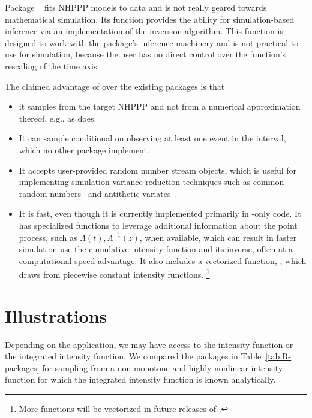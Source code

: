 \documentclass[article]{jss}\usepackage[]{graphicx}\usepackage[]{xcolor}
\newcommand{\fct}[1]{\code{#1()}}
\begin{document}
Package ~\citep{NHPoisson-jss, NHPoisson-package} fits NHPPP models to data and is not really geared towards mathematical simulation. Its \fct{simNHP.fun} function provides the ability for simulation-based inference via an implementation of the inversion algorithm. This function is designed to work with the package's inference machinery and is not practical to use for simulation, because the user has no direct control over the function's rescaling of the time axis.

The claimed advantage of  over the existing packages is that
\begin{itemize}
\item it samples from the target NHPPP and not from a numerical approximation thereof, e.g., as  does.
\item It can  sample conditional on observing at least one event in the interval, which no other package implement.
\item It accepts user-provided random number stream objects, which is useful for implementing simulation variance reduction techniques such as common random numbers~\citep{wright1979crn} and antithetic variates~\citep{hammersley1956av}.
\item It is fast, even though it is currently implemented primarily in -only code. It has specialized functions to leverage additional information about the point process, such as $\Lambda(t), \Lambda^{-1}(z)$, when available, which can result in faster simulation  use the cumulative intensity function and its inverse, often at a computational speed advantage. It also includes a vectorized function, \fct{vdraw\_sc\_step\_regular}, which draws from piecewise constant intensity functions.%
\footnote{More functions will be vectorized in future releases of .}
\end{itemize}



\section{Illustrations} \label{sec:illustrations}

Depending on the application, we may have access to the intensity function
or the integrated intensity function.
We compared the  packages in Table~\ref{tab:R-packages} for sampling from a non-monotone and highly nonlinear intensity function for which the integrated intensity function is known analytically.
\end{document}
